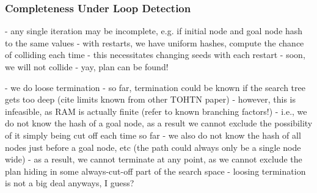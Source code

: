 \subsubsection{Completeness Under Loop Detection}
- any single iteration may be incomplete, e.g. if initial node and goal node hash to the same values
- with restarts, we have uniform hashes, compute the chance of colliding each time
- this necessitates changing seeds with each restart
- soon, we will not collide
- yay, plan can be found!

- we do loose termination
- so far, termination could be known if the search tree gets too deep (cite limits known from other TOHTN paper)
- however, this is infeasible, as RAM is actually finite (refer to known branching factors!)
- i.e., we do not know the hash of a goal node, as a result we cannot exclude the possibility of it simply being cut off each time so far
- we also do not know the hash of all nodes just before a goal node, etc (the path could always only be a single node wide)
- as a result, we cannot terminate at any point, as we cannot exclude the plan hiding in some always-cut-off part of the search space
- loosing termination is not a big deal anyways, I guess?

